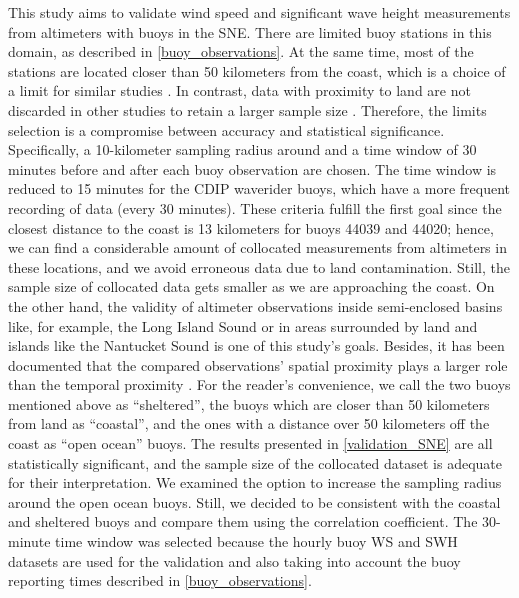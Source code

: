 This study aims to validate wind speed and significant wave height measurements from altimeters with buoys in the SNE. There are limited buoy stations in this domain, as described in \ref{buoy_observations}. At the same time, most of the stations are located closer than 50 kilometers from the coast, which is a choice of a limit for similar studies \cite{Yang2019}. In contrast, data with proximity to land are not discarded in other studies to retain a larger sample size \cite{Queffeulou2004}. Therefore, the limits selection is a compromise between accuracy and statistical significance. Specifically, a 10-kilometer sampling radius around and a time window of 30 minutes before and after each buoy observation are chosen. The time window is reduced to 15 minutes for the CDIP waverider buoys, which have a more frequent recording of data (every 30 minutes). These criteria fulfill the first goal since the closest distance to the coast is 13 kilometers for buoys 44039 and 44020; hence, we can find a considerable amount of collocated measurements from altimeters in these locations, and we avoid erroneous data due to land contamination. Still, the sample size of collocated data gets smaller as we are approaching the coast. On the other hand, the validity of altimeter observations inside semi-enclosed basins like, for example, the Long Island Sound or in areas surrounded by land and islands like the Nantucket Sound is one of this study's goals. Besides, it has been documented that the compared observations' spatial proximity plays a larger role than the temporal proximity \cite{Hwang1998, Monaldo1988}. For the reader’s convenience, we call the two buoys mentioned above as \enquote{sheltered}, the buoys which are closer than 50 kilometers from land as \enquote{coastal}, and the ones with a distance over 50 kilometers off the coast as \enquote{open ocean} buoys. The results presented in \ref{validation_SNE} are all statistically significant, and the sample size of the collocated dataset is adequate for their interpretation. We examined the option to increase the sampling radius around the open ocean buoys. Still, we decided to be consistent with the coastal and sheltered buoys and compare them using the correlation coefficient. The 30-minute time window was selected because the hourly buoy WS and SWH datasets are used for the validation and also taking into account the buoy reporting times described in \ref{buoy_observations}.



